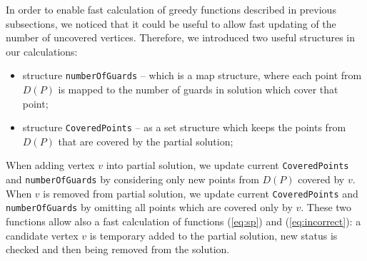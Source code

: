 \documentclass[runningheads,a4paper]{elsarticle}
\begin{document}
	In order to enable fast calculation of greedy functions described in previous subsections, we noticed that it could be useful to allow fast updating of the number of uncovered vertices. Therefore, we introduced two useful structures in our calculations: %
	\begin{itemize}
		\item structure \texttt{numberOfGuards} -- which is a map structure, where each point from $D(P)$ is mapped to the number of guards in solution which cover that point;
		\item structure \texttt{CoveredPoints} -- as a set structure which keeps the points from $D(P)$ that are covered by the partial solution;
	\end{itemize}
  When adding vertex $v$ into partial solution, we update current \texttt{CoveredPoints} and \texttt{numberOfGuards} by considering only new points from $D(P)$ covered by $v$.
  When $v$ is removed from partial solution, we update current \texttt{CoveredPoints} and \texttt{numberOfGuards} by omitting all points which are covered only by $v$.  These two functions allow also a fast calculation of  functions (\ref{eq:sp}) and  (\ref{eq:incorrect}): a candidate vertex $v$ is temporary added to the partial solution, new status is checked and then being removed from the solution.


\end{document}
